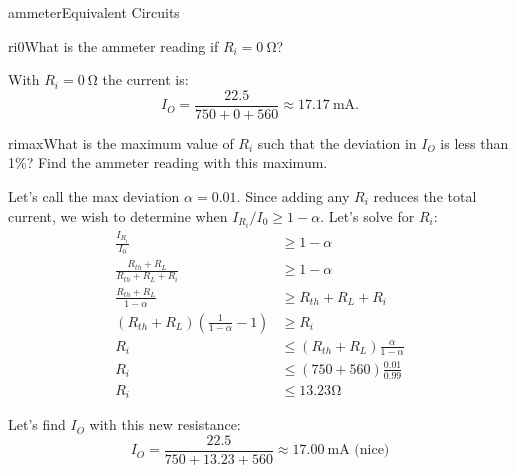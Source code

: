\begin{mainquestion}{ammeter}{Equivalent Circuits}
\begin{partquestion}{ri0}{What is the ammeter reading if $R_{i}=\qty{0}{\ohm}$?}
\begin{answer}
With $R_{i}=\qty{0}{\ohm}$ the current is:
\[
I_O = \frac{22.5}{750 + 0 + 560} \approx \qty{17.17}{\milli\ampere}.
\]
\end{answer}
\end{partquestion}

\begin{partquestion}{rimax}{What is the maximum value of $R_{i}$ such that the deviation in $I_O$ is less than 1\%? Find the ammeter reading with this maximum.}
\begin{answer}
Let's call the max deviation $\alpha = 0.01$. Since adding any $R_i$ reduces the total current, we wish to determine when $I_{R_i}/I_{0} \geq 1-\alpha$. Let's solve for $R_i$:
\begin{align*}
    \frac{I_{R_i}}{I_0} &\geq 1-\alpha \\
    \frac{R_{th} + R_L}{R_{th} + R_L + R_i} &\geq 1-\alpha \\
    \frac{R_{th} + R_L}{1-\alpha} &\geq R_{th} + R_L + R_i \\
    (R_{th} + R_L)(\frac{1}{1-\alpha} - 1) &\geq R_i \\
    R_i &\leq (R_{th} + R_L)\frac{\alpha}{1-\alpha} \\
    R_i &\leq (750 + 560)\frac{0.01}{0.99} \\
    R_i &\leq 13.23\unit{\ohm}
\end{align*}

Let's find $I_O$ with this new resistance:
\[
I_O = \frac{22.5}{750 + 13.23 + 560} \approx 17.00~\text{mA (nice)}
\]

\end{answer}
\end{partquestion}

\end{mainquestion}
